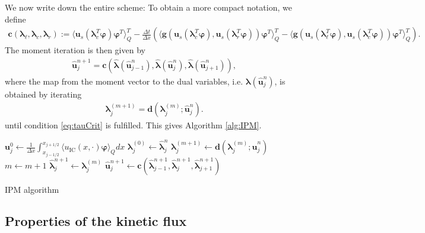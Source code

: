 We now write down the entire scheme: To obtain a more compact notation, we define
\begin{align}\label{eq:momentIterationFunction}
\bm{c}\left(\bm{\lambda}_{\ell},\bm{\lambda}_c,\bm{\lambda}_r\right):= \langle \bm u_{s}(\bm{\lambda}_c^T\bm{\varphi})\bm{\varphi}^T\rangle_Q^T - \frac{\Delta t}{\Delta x}\left(\langle \bm g(\bm u_{s}(\bm{\lambda}_c^T\bm{\varphi}),\bm u_{s}(\bm{\lambda}_r^T\bm{\varphi}))\bm{\varphi}^T\rangle_Q^T-\langle \bm g(\bm u_{s}(\bm{\lambda}_{\ell}^T\bm{\varphi}),\bm u_{s}(\bm{\lambda}_c^T\bm{\varphi}))\bm{\varphi}^T\rangle_Q^T\right).
\end{align}
The moment iteration is then given by
\begin{align}\label{eq:momentIteration}
\bm{\hat u}_j^{n+1} = \bm{c}\left(\bm{\hat\lambda}(\bm{\hat u}_{j-1}^n),\bm{\hat\lambda}(\bm{\hat u}_{j}^n),\bm{\hat\lambda}(\bm{\hat u}_{j+1}^n)\right),
\end{align}
where the map from the moment vector to the dual variables, i.e. $\bm{\lambda}(\bm{\hat u}_{j}^n)$, is obtained by iterating
\begin{align}\label{eq:dualIteration}
\bm{\lambda}_j^{(m+1)} = \bm{d}(\bm{\lambda}_{j}^{(m)};\bm{\hat u}_j^{n}).
\end{align}
until condition \eqref{eq:tauCrit} is fulfilled. This gives Algorithm \ref{alg:IPM}.

\begin{algorithm}[H]
\begin{algorithmic}[1]
\State $\bm{u}_j^0 \leftarrow \frac{1}{\Delta x} \int_{x_{j-1/ 2}}^{x_{j+1/ 2}} \langle u_{\text{IC}}(x, \cdot) \bm{\varphi} \rangle_Q dx$
\EndFor
{}
\State $\bm{\lambda}_j^{(0)} \leftarrow \bm{\hat \lambda}_j^{n}$
\State $\bm{\lambda}_j^{(m+1)} \leftarrow \bm{d}(\bm{\lambda}_{j}^{(m)};\bm{\hat u}_j^{n})$
\State $m \leftarrow m+1$
\EndWhile
\State $\bm{\hat \lambda}_j^{n+1} \leftarrow \bm{\lambda}_j^{(m)}$
\EndFor
{}
\State $\bm{\hat u}_j^{n+1} \leftarrow \bm{c}(\bm{\hat \lambda}_{j-1}^{n+1},\bm{\hat \lambda}_j^{n+1},\bm{\hat \lambda}_{j+1}^{n+1})$
\EndFor
\EndFor
\end{algorithmic}
\caption{IPM algorithm}
\label{alg:IPM}
\end{algorithm}

\subsection{Properties of the kinetic flux}
\label{sec:costNumFlux}

